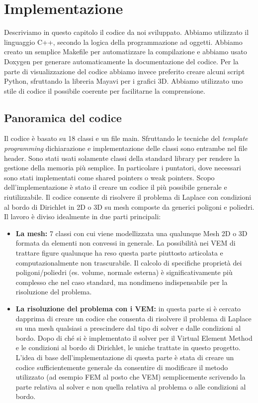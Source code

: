 \documentclass[oneside,12pt]{book}  %
\theoremstyle{plain}
\theoremstyle{definition}
\theoremstyle{remark}
\numberwithin{equation}{chapter} %
\begin{document}
 

\chapter{Implementazione}
\label{ch:implementazione}

Descriviamo in questo capitolo il codice da noi sviluppato. Abbiamo
utilizzato il linguaggio C++, secondo la logica della programmazione
ad oggetti. Abbiamo creato un semplice Makefile per automatizzare la
compilazione e abbiamo usato Doxygen per generare automaticamente la
documentazione del codice.
Per la parte di visualizzazione del codice abbiamo invece preferito
creare alcuni script Python, sfruttando la libreria Mayavi per i
grafici 3D.
Abbiamo utilizzato uno stile di codice il possibile coerente per
facilitarne la comprensione.

\section{Panoramica del codice}
\label{sec:panoramica}
Il codice \`e basato su 18 classi e un file main. Sfruttando le
tecniche del \textit{template programming} dichiarazione e
implementazione delle classi sono entrambe nel file header.
Sono stati usati solamente classi della standard library per rendere
la gestione della memoria pi\`u semplice. In particolare i puntatori,
dove necessari sono stati implementati come shared pointers o weak
pointers. 
Scopo dell'implementazione \`e stato il creare un codice il pi\`u
possibile generale e riutilizzabile. Il codice consente di risolvere
il problema di Laplace con condizioni al bordo di Dirichlet in 2D o 3D
su mesh composte da generici poligoni e poliedri.
Il lavoro \`e diviso idealmente in due parti principali:
\begin{itemize}
\item
\textbf{La mesh:} 7 classi con cui viene modellizzata una qualunque
Mesh 2D o 3D formata da elementi non convessi in generale. La
possibilit\`a nei VEM di trattare figure qualunque ha
reso questa parte piuttosto articolata e computazionalmente non
trascurabile. Il calcolo di specifiche propriet\`a dei
poligoni/poliedri (es. volume, normale esterna) \`e significativamente
pi\`u complesso che nel caso standard, ma nondimeno indispensabile per
la risoluzione del problema.

\item
\textbf{La risoluzione del problema con i VEM:} in questa parte si \`e
cercato dapprima di creare un codice che consenta di risolvere il
problema di Laplace su una mesh qualsiasi a prescindere dal tipo di
solver e dalle condizioni al bordo. Dopo di ch\'e si \`e implementato
il solver per il Virtual Element Method e le condizioni al bordo di
Dirichlet, le uniche trattate in questo progetto.
L'idea di base dell'implementazione di questa parte \`e stata di
creare un codice sufficientemente generale da consentire di modificare
il metodo utilizzato (ad esempio FEM al posto che VEM) semplicemente
scrivendo la parte relativa al solver e non quella relativa al
problema o alle condizioni al bordo.

\end{itemize}
\end{document}
